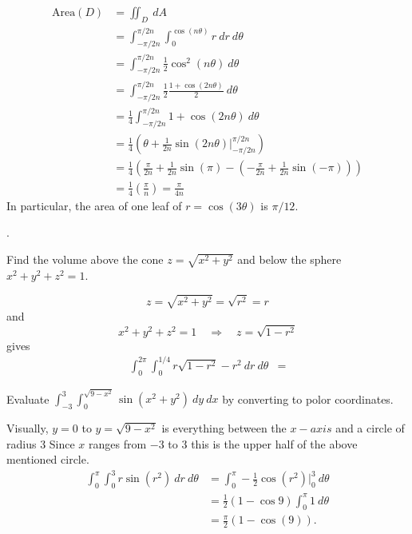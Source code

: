 \documentclass[12pt]{exam}
\begin{document}
\begin{questions}
\begin{solution}
            \begin{align*}
                \text{Area}(D) &= \iint_D~dA\\
                    & = \int_{-\pi/2n}^{\pi/2n}\int_{0}^{\cos(n\theta)} r~dr~d\theta\\
                    &= \int_{-\pi/2n}^{\pi/2n} \frac{1}{2}\cos^2(n\theta)~d\theta \\
                    &= \int_{-\pi/2n}^{\pi/2n}\frac{1}{2}\frac{1+\cos(2n\theta)}{2}~d\theta\\
                    &= \frac{1}{4}\int_{-\pi/2n}^{\pi/2n} 1+\cos(2n\theta)~d\theta\\
                    &= \frac{1}{4}\left( \theta+\frac{1}{2n}\sin(2n\theta)|_{-\pi/2n}^{\pi/2n} \right)\\
                    &= \frac{1}{4}\left(
                        \frac{\pi}{2n}+\frac{1}{2n}\sin(\pi)-\left(-\frac{\pi}{2n}+\frac{1}{2n}\sin(-\pi)\right)
                        \right)\\
                        &= \frac{1}{4}\left(\frac{\pi}{n}\right)=\frac{\pi}{4n}
            \end{align*}
            In particular, the area of one leaf of \(r=\cos(3\theta)\) is \(\pi/12\). 
        \end{solution}
    \else
        \vfill
    \fi.


\question Find the volume above the cone \(z=\sqrt{x^2+y^2}\) and below the sphere \(x^2+y^2+z^2=1\).
\ifprintanswers
        \begin{solution}
            \[z=\sqrt{x^2+y^2}=\sqrt{r^2}=r\]
            and 
            \[
                x^2+y^2+z^2=1 \quad\Rightarrow\quad z=\sqrt{1-r^2}
            \]
            gives
            \begin{align*}
                \int_0^{2\pi}\int_0^{1/4} r\sqrt{1-r^2}-r^2~dr~d\theta & = 
            \end{align*}

        \end{solution}
    \else
        \vfill
    \fi

\newpage

\question Evaluate \(\int_{-3}^3\int_{0}^{\sqrt{9-x^2}}\sin\left(x^2+y^2\right)~dy~dx\) by converting to polor coordinates.
\ifprintanswers
        \begin{solution}
            Visually, \(y=0\) to \(y=\sqrt{9-x^2}\) is everything between the \(x-axis\) and a circle of radius 3
            Since \(x\) ranges from \(-3\) to \(3\) this is the upper half of the above mentioned circle.
            \begin{align*}
                \int_0^{\pi}\int_{0}^{3} r\sin(r^2)~dr~d\theta & = \int_0^\pi -\frac{1}{2}\cos(r^2)|_0^3 ~d\theta\\
                    &= \frac{1}{2}\left(1-\cos 9\right)\int_{0}^{\pi}1~d\theta\\
                    &= \frac{\pi}{2}(1-\cos(9)).
            \end{align*}
        \end{solution}
    \else
        \vfill
    \fi


\end{questions}
\end{document}
